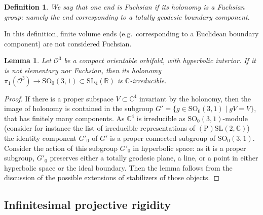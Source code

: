 \documentclass[a4paper,11pt]{article}
\newtheorem{Definition}[Theorem]{Definition}
\newtheorem{Lemma}[Theorem]{Lemma}
\begin{document}
\begin{Definition}
We say that one end is \emph{Fuchsian} if its holonomy is a Fuchsian group: namely the end corresponding to a totally geodesic 
boundary component.  
\end{Definition}

In this definition, finite volume ends (e.g.~corresponding to
a Euclidean boundary component) are not considered Fuchsian.


\begin{Lemma}
\label{Lemma:03irr}
 Let $\mathcal O^3$ be a compact orientable orbifold, with  hyperbolic interior. If it is not elementary nor 
Fuchsian, then its holonomy
 $\pi_1(\mathcal O^3)\to \mathrm{SO}_0(3,1)\subset
 \mathrm{SL}_4(\mathbb R)$ is $\mathbb C$-irreducible.~
\end{Lemma}


\begin{proof}
 If there is a proper subspace  $V\subset \mathbb C^4$ invariant by the holonomy, then the image of holonomy
 is contained in the  subgroup $G'=\{g\in \mathrm{SO}_0(3,1)\mid g V= V\}$, that has finitely many components. 
 As $\mathbb C^4$ is irreducible as  $\mathrm{SO}_0(3,1)$-module (consider for 
  instance the list of irreducible representations of $\mathrm{(P)SL}(2,\mathbb C)$) the identity component
  $G'_0$  of $G'$ 
 is a proper connected subgroup of $\mathrm{SO}_0(3,1)$. 
  Consider the action of this subgroup $G'_0$ in hyperbolic space: as it is a proper subgroup, $G'_0$  preserves either a totally geodesic plane,
a line,  or a point in either hyperbolic space or the ideal boundary. Then the lemma follows from the discussion of 
the possible extensions of stabilizers of those objects.
\end{proof}





\subsection{Infinitesimal projective rigidity}





\end{document}
